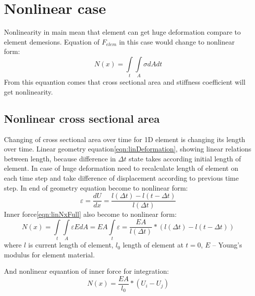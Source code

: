\documentclass[12pt]{report}
\begin{document}
\section{Nonlinear case}
Nonlinearity in main mean that element can get huge deformation compare to
element demesions. Equation of $F_{elem}$ in this case  would change to
nonlinear form:
\begin{equation}\label{eqn:nonlinNx}
  N(x)= \int\limits_t\int\limits_A \sigma dAdt
\end{equation}
From this equantion comes that cross sectional area and stiffness coefficient
will get nonlinearity. \par \subsection{Nonlinear cross sectional area}\par
Changing of cross sectional area over time for 1D element is changing its length
over time. Linear geometry equation\eqref{eqn:linDeformation}, showing linear
relations between length, because difference in $\Delta t$ state takes according
initial length of element. In case of huge deformation need to recalculate
length of element on each time step and take difference of displacement
according to previous time step. In end of geometry equation become to nonlinear
form:
\begin{equation}\label{eqn:nonlinDeformation}
  \varepsilon=\frac{dU}{dx}=\frac{l(\Delta t)-l(t-\Delta t)}{l(\Delta t)}
\end{equation}
Inner force\eqref{eqn:linNxFull} also become to nonlinear form:
\begin{equation}\label{eqn:nonlinNxFull}
  N(x)= \int\limits_t\int\limits_A \varepsilon EdA=EA\int\limits_t\varepsilon=\frac{EA}{l(\Delta t)}*(l(\Delta t)-l(t-\Delta t))
\end{equation}
where $l$ is current length of element, $l_0$ length of element at $t=0$, $E$ –
Young’s modulus for element material.\par And nonlinear equantion of inner force
for integration:
\begin{equation}\label{eqn:nonlinNxWdispl}
  N(x)=\frac{EA}{l_0}*(U_{i}-U_{j})
\end{equation}\par
\end{document}

